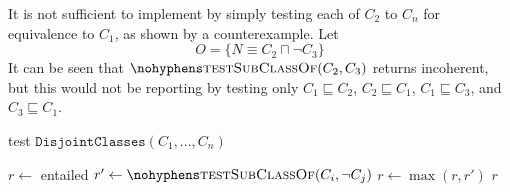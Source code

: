 \documentclass[paper.tex]{subfiles}
\begin{document}
It is not sufficient to implement  by simply testing each of $C_2$ to $C_n$ for equivalence to $C_1$, as shown by a counterexample.  Let
\[ O = \{ N \equiv C_2 \sqcap \neg C_3 \} \]
It can be seen that $\textproc{testSubClassOf}(C_2, C_3)$ returns incoherent, but this would not be reporting by testing only $C_1 \sqsubseteq C_2$, $C_2 \sqsubseteq C_1$, $C_1 \sqsubseteq C_3$, and $C_3 \sqsubseteq C_1$.

\medskip

\begin{algorithm}[H]
  \caption{test $\mathtt{DisjointClasses}(C_1, \ldots, C_n)$}
  \begin{algorithmic}[1]
    \raggedright
      \State $r \gets$ entailed
          \State $r' \gets \Call{testSubClassOf}{C_i, \neg C_j}$
          \label{alg:testDisjointClasses:inner}
          \State $r \gets \max(r, r')$
        \EndFor
      \EndFor
      \State \Return $r$
    \EndFunction
  \end{algorithmic}
\end{algorithm}
\end{document}
